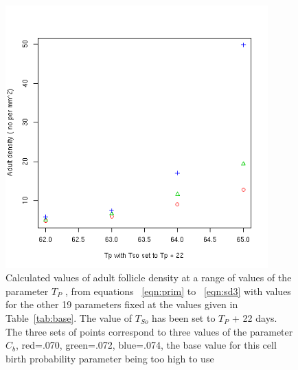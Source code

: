 %

\begin{figure}[!h]
  \centering
   \includegraphics[width=0.9\textwidth]{tptsodens.png}
  \caption{Calculated values of adult follicle density at a range of values of the parameter $T_{P}$ ,  from equations ~\ref{eqn:prim} to ~\ref{eqn:sd3} with values for the other 19  parameters fixed at the values given in Table~\ref{tab:base}. The value of $T_{So}$ has been set to $T_{P}$ + 22 days. The three sets of points correspond to three values of the parameter $C_{b}$, red=.070, green=.072, blue=.074, the base value for this cell birth probability parameter being too high to use}
  \label{fig:tptsodens}
\end{figure}

%

